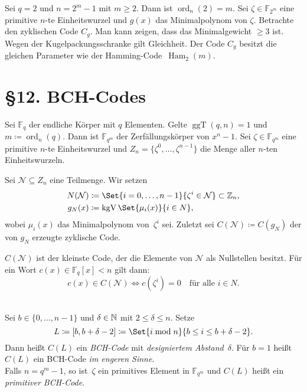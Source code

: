 \documentclass{cheat-sheet}
\newcommand{\F}{\mathbb{F}} %
\DeclareMathOperator{\Ham}{Ham} %
\DeclareMathOperator{\ggT}{ggT} %
\DeclareMathOperator{\kgV}{kgV} %
\DeclareMathOperator{\ord}{ord} %
\begin{document}


\begin{bsp}
  Sei $q = 2$ und $n = 2^m - 1$ mit $m \geq 2$.
  Dann ist $\ord_n(2) = m$.
  Sei $\zeta \in \F_{2^m}$ eine primitive $n$-te Einheitswurzel und $g(x)$ das Minimalpolynom von $\zeta$.
  Betrachte den zyklischen Code $C_g$.
  Man kann zeigen, dass das Minimalgewicht $\geq 3$ ist.
  Wegen der Kugelpackungsschranke gilt Gleichheit.
  Der Code $C_g$ besitzt die gleichen Parameter wie der Hamming-Code~$\Ham_2(m)$.
\end{bsp}


\section{§12. BCH-Codes}


\begin{situation}
  Sei $\F_q$ der endliche Körper mit $q$ Elementen.
  Gelte $\ggT(q, n) = 1$ und $m \coloneqq \ord_n(q)$.
  Dann ist $\F_{q^m}$ der Zerfällungskörper von $x^n - 1$.
  Sei $\zeta \in \F_{q^m}$ eine primitive $n$-te Einheitswurzel und $Z_n = \{ \zeta^0, \ldots, \zeta^{n-1} \}$ die Menge aller $n$-ten Einheitswurzeln.
\end{situation}

\begin{konstr}
  Sei $\mathcal{N} \subseteq Z_n$ eine Teilmenge.
  Wir setzen
  \begin{align*}
    N(\mathcal{N}) & \coloneqq \Set{i = 0, \ldots, n-1}{\zeta^i \in \mathcal{N}} \subset \Z_n, \\
    g_N(x) & \coloneqq \kgV \Set{\mu_i(x)}{i \in N},
  \end{align*}
  wobei $\mu_i(x)$ das Minimalpolynom von~$\zeta^i$ sei.
  Zuletzt sei $C(\mathcal{N}) \coloneqq C(g_N)$ der von $g_N$ erzeugte zyklische Code.
\end{konstr}

\begin{bem}
  $C(\mathcal{N})$ ist der kleinste Code, der die Elemente von $\mathcal{N}$ als Nullstellen besitzt. 
  Für ein Wort $c(x) \in \F_q[x]{< n}$ gilt dann:
  \[
    c(x) \in C(\mathcal{N}) \iff c(\zeta^i) = 0 \quad \text{für alle $i \in N$}.
  \]
\end{bem}

\begin{defn} \mbox{} \\
  Sei $b \in \{ 0, \ldots, n-1 \}$ und $\delta \in \mathbb{N}$ mit $2 \leq \delta \leq n$.
  Setze
  \[
    L \coloneqq [b, b + \delta - 2] \coloneqq \Set{i \bmod{n}}{b \leq i \leq b + \delta - 2}.
  \]
  Dann heißt $C(L)$ ein \emph{BCH-Code} mit \emph{designiertem Abstand}~$\delta$.
  Für $b=1$ heißt~$C(L)$ ein BCH-Code \textit{im engeren Sinne}. \\
  Falls $n = q^m - 1$, so ist~$\zeta$ ein primitives Element in $\F_{q^m}$ und $C(L)$ heißt ein \emph{primitiver BCH-Code}.
\end{defn}
\end{document}
